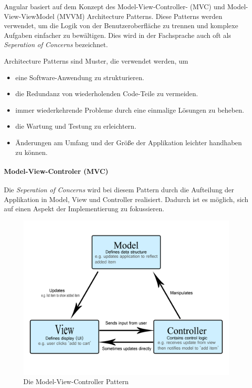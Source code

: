 Angular basiert auf dem Konzept des Model-View-Controller- (MVC) und Model-View-ViewModel (MVVM) Architecture Patterns. Diese Patterns werden verwendet, um die Logik von der Benutzeroberfläche zu trennen und komplexe Aufgaben einfacher zu bewältigen. Dies wird in der Fachsprache auch oft als \emph{Seperation of Concerns} bezeichnet.
\cite{AngularArchitecturePattern} 

Architecture Patterns sind Muster, die verwendet werden, um
\begin{itemize}
  \item eine Software-Anwendung zu strukturieren.
  \item die Redundanz von wiederholenden Code-Teile zu vermeiden.
  \item immer wiederkehrende Probleme durch eine einmalige Lösungen zu beheben.
  \item die Wartung und Testung zu erleichtern.
  \item Änderungen am Umfang und der Größe der Applikation leichter handhaben zu können.
\end{itemize} \cite{MVCmdn, MVVM, MVC}

\paragraph{Model-View-Controler (MVC)}
Die \emph{Seperation of Concerns} wird bei diesem Pattern durch die Aufteilung der Applikation in Model, View und Controller realisiert. Dadurch ist es möglich, sich auf einen Aspekt der Implementierung zu fokussieren. 

\begin{figure} [h t]
  \centering
  \includegraphics[scale=0.5]{pics/mvc.png}
  \caption{Die Model-View-Controller Pattern \cite{MVCmdn}}
  \label{fig:tech:front:mvc-architecture}
\end{figure}

